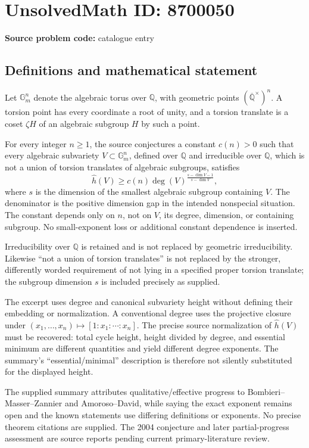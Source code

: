 \documentclass[11pt]{article}
\begin{document}
\section*{UnsolvedMath ID: 8700050}
\textbf{Source problem code:} catalogue entry
\subsection{Definitions and mathematical statement}
Let \(\mathbb G_m^n\) denote the algebraic torus over \(\mathbb Q\), with geometric points \((\overline{\mathbb Q}^{\times})^n\). A torsion point has every coordinate a root of unity, and a torsion translate is a coset \(\zeta H\) of an algebraic subgroup \(H\) by such a point.

For every integer \(n\ge1\), the source conjectures a constant \(c(n)>0\) such that every algebraic subvariety \(V\subset\mathbb G_m^n\), defined over \(\mathbb Q\) and irreducible over \(\mathbb Q\), which is not a union of torsion translates of algebraic subgroups, satisfies
\[
 \widehat h(V)\ge c(n)\deg(V)^{\frac{s-\dim V-1}{s-\dim V}},
\]
where \(s\) is the dimension of the smallest algebraic subgroup containing \(V\). The denominator is the positive dimension gap in the intended nonspecial situation. The constant depends only on \(n\), not on \(V\), its degree, dimension, or containing subgroup. No small-exponent loss or additional constant dependence is inserted.

Irreducibility over \(\mathbb Q\) is retained and is not replaced by geometric irreducibility. Likewise ``not a union of torsion translates'' is not replaced by the stronger, differently worded requirement of not lying in a specified proper torsion translate; the subgroup dimension \(s\) is included precisely as supplied.

The excerpt uses degree and canonical subvariety height without defining their embedding or normalization. A conventional degree uses the projective closure under \((x_1,\ldots,x_n)\mapsto[1:x_1:\cdots:x_n]\). The precise source normalization of \(\widehat h(V)\) must be recovered: total cycle height, height divided by degree, and essential minimum are different quantities and yield different degree exponents. The summary's ``essential/minimal'' description is therefore not silently substituted for the displayed height.

The supplied summary attributes qualitative/effective progress to Bombieri--Masser--Zannier and Amoroso--David, while saying the exact exponent remains open and the known statements use differing definitions or exponents. No precise theorem citations are supplied. The 2004 conjecture and later partial-progress assessment are source reports pending current primary-literature review.
\end{document}
